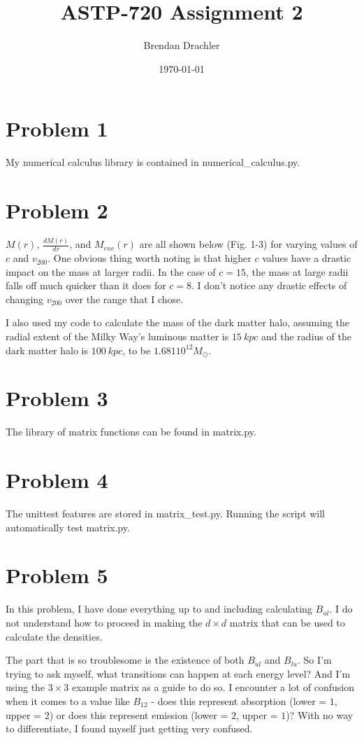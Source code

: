 \documentclass[12pt, letterpaper]{article}
\title{ASTP-720 Assignment 2}
\author{Brendan Drachler}
\date{\today}
\begin{document}
\section*{Problem 1}

My numerical calculus library is contained in {numerical\_calculus.py}.

\section*{Problem 2}

$M(r)$, $\frac{d M(r)}{dr}$, and $M_{enc}(r)$ are all shown below (Fig. 1-3) for varying values of $c$ and $v_{200}$. One obvious thing worth noting is that higher $c$ values have a drastic impact on the mass at larger radii. In the case of $c=15$, the mass at large radii falls off much quicker than it does for $c=8$.  I don't notice any drastic effects of changing $v_{200}$ over the range that I chose.


I also used my code to calculate the mass of the dark matter halo, assuming the radial extent of the Milky Way's luminous matter is $15 \ kpc$ and the radius of the dark matter halo is $100 \ kpc$, to be $1.681 10^{12} M_\odot$. 

\section*{Problem 3}

The library of matrix functions can be found in {matrix.py}.

\section*{Problem 4}
The unittest features are stored in matrix\_test.py. Running the script will automatically test matrix.py.

\section*{Problem 5}
In this problem, I have done everything up to and including calculating $B_{ul}$. I do not understand how to proceed in making the $ d \times d$ matrix that can be used to calculate the densities. 

The part that is so troublesome is the existence of both $B_{ul}$ and $B_{lu}$. So I'm trying to ask myself, what transitions can happen at each energy level? And I'm using the $3 \times 3$ example matrix as a guide to do so. I encounter a lot of confusion when it comes to a value like $B_{12}$ - does this represent absorption (lower = $1$, upper = $2$) or does this represent emission (lower = $2$, upper = $1$)? With no way to differentiate, I found myself just getting very confused. 
\end{document}
